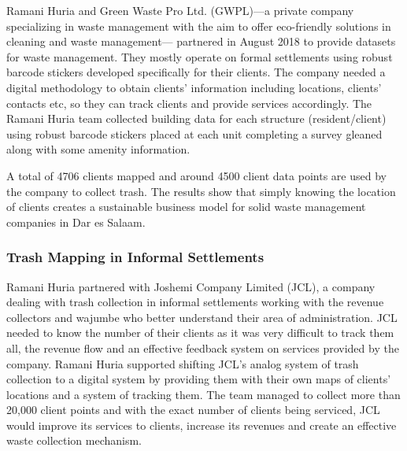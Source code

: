 \documentclass[a4paper,12pt,twoside]{article}
\begin{document}
\begin{multicols}{2}
	Ramani Huria and Green Waste Pro Ltd. (GWPL)---a private company specializing in waste management with the aim to offer eco-friendly solutions in cleaning and waste management--- partnered in August 2018 to provide datasets for waste management. They mostly operate on formal settlements using robust barcode stickers developed specifically for their clients. The company needed a digital methodology to obtain clients’ information including locations, clients' contacts etc, so they can track clients and provide services accordingly. The Ramani Huria team collected building data for each structure (resident/client) using robust barcode stickers placed at each unit completing a survey gleaned along with some amenity information. 
	
	A total of 4706 clients mapped and around 4500 client data points are used by the company to collect trash. The results show that simply knowing the location of clients creates a sustainable business model  for solid waste management companies in Dar es Salaam. 
\end{multicols}

\subsubsection{Trash Mapping in Informal Settlements}
\begin{multicols}{2}
Ramani Huria partnered with Joshemi Company Limited (JCL), a company dealing with trash collection in informal settlements working with the revenue collectors and wajumbe who better understand their area of administration. JCL needed to know the number of their clients as it was very difficult to track them all, the revenue flow and an effective feedback system on services provided by the company.
Ramani Huria supported shifting JCL’s analog system of trash collection to a digital system by providing them with their own maps of clients’ locations and a system of tracking them. The team managed to collect more than 20,000 client points and with the exact number of clients being serviced, JCL would improve its services to clients, increase its revenues and create an effective waste collection mechanism.
\end{multicols}

\newpage
\end{document}
